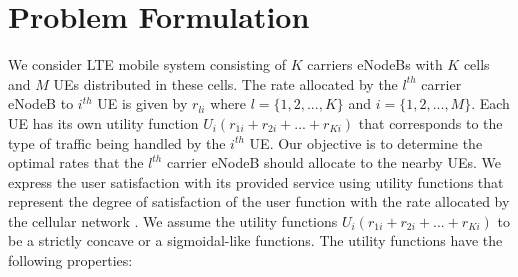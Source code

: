 \documentclass[journal]{IEEEtran} 		\usepackage{amsmath,amssymb}
\begin{document}
\section{Problem Formulation}\label{sec:Problem_formulation}

We consider LTE mobile system consisting of $K$ carriers eNodeBs with $K$ cells and $M$ UEs distributed in these cells. The rate allocated by the $l^{th}$ carrier eNodeB to $i^{th}$ UE is given by $r_{li}$ where $l =\{1,2, ..., K\}$ and $i = \{1,2, ...,M\}$. Each UE has its own utility function $U_i(r_{1i}+r_{2i}+ ...+r_{Ki})$ that corresponds to the type of traffic being handled by the $i^{th}$ UE. Our objective is to determine the optimal rates that the $l^{th}$ carrier eNodeB should allocate to the nearby UEs. We express the user satisfaction with its provided service using utility functions that represent the degree of satisfaction of the user function with the rate allocated by the cellular network \cite{DL_PowerAllocation} \cite{fundamental_design} \cite{UtilityFairness}. We assume the utility functions $U_i(r_{1i}+r_{2i}+ ...+r_{Ki})$ to be a strictly concave or a sigmoidal-like functions. The utility functions have the following properties:
\end{document}
